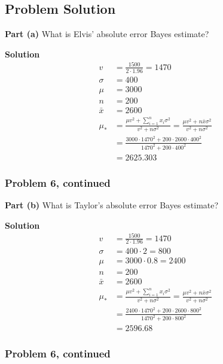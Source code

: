 \documentclass[12pt]{article}
\theoremstyle{definition}
\begin{document}
\subsection*{Problem Solution}

\bigskip
\noindent
{\bf Part (a)} What is Elvis' absolute error Bayes estimate?


\bigskip
\noindent
{\bf Solution}
\begin{align*}
v &=  \frac{1500}{2\cdot 1.96} = 1470\\
\sigma &= 400\\
\mu &= 3000\\
n &= 200\\
\bar{x} &= 2600\\
\mu_{*} &= \frac{\mu v^2 + \sum_{i=1}^n x_i \sigma^2}{v^2 + n\sigma^2} = \frac{\mu v^2 + n \bar{x}\sigma^2}{v^2 + n\sigma^2}\\
&= \frac{3000 \cdot 1470^2 + 200 \cdot 2600 \cdot 400^2}{1470^2 + 200 \cdot 400^2}\\
&= 2625.303
\end{align*}

\newpage
\subsubsection*{Problem 6, continued}

\vspace{3.5in}
\noindent
{\bf Part (b)} What is Taylor's absolute error Bayes estimate?

\bigskip
\noindent
{\bf Solution}
\begin{align*}
v &=  \frac{1500}{2\cdot 1.96} = 1470\\
\sigma &= 400 \cdot 2 = 800\\
\mu &= 3000 \cdot 0.8 = 2400\\
n &= 200\\
\bar{x} &= 2600\\
\mu_{*} &= \frac{\mu v^2 + \sum_{i=1}^n x_i \sigma^2}{v^2 + n\sigma^2} = \frac{\mu v^2 + n \bar{x}\sigma^2}{v^2 + n\sigma^2}\\
&= \frac{2400 \cdot 1470^2 + 200 \cdot 2600 \cdot 800^2}{1470^2 + 200 \cdot 800^2}\\
&= 2596.68
\end{align*}
\newpage
\subsubsection*{Problem 6, continued}
\end{document}

